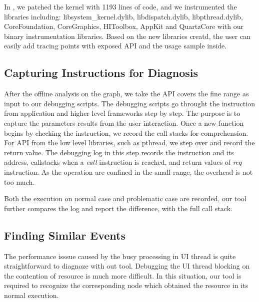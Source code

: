 

In \xxx, we patched the kernel with 1193 lines of code, and we instrumented the
libraries including: libsystem\_kernel.dylib, libdispatch.dylib,
libpthread.dylib, CoreFoundation, CoreGraphics, HIToolbox, AppKit and
QuartzCore with our binary instrumentation libraries.  Based on the new
libraries creatd, the user can easily add tracing points with exposed API and
the usage sample inside.

\subsection{Capturing Instructions for Diagnosis}


After the offline analysis on the graph, we take the API covers the fine range
as input to our debugging scripts.  The debugging scripts go throught the
instruction from application and higher level frameworks step by step.  The
purpose is to capture the parameters results from the user interaction.  Once a
new function begins by checking the instruction, we record the call stacks for
comprehension.  For API from the low level libraries, such as pthread, we step
over and record the return value. The debugging log in this step records the
instruction and its address, callstacks when a \textit{call} instruction is reached,
and return values of \textit{req} instruction.  As the operation are confined in the
small range, the overhead is not too much.

Both the execution on normal case and problematic case are recorded, our tool
further compares the log and report the difference, with the full call stack.

\subsection{Finding Similar Events}

The performance isssue caused by the busy processing in UI thread is quite
straightforward to diagnoze with out tool.  Debugging the UI thread blocking on
the contention of resource is much more difficult.  In this situation, our tool
is required to recognize the corresponding node which obtained the resource in
its normal execution.

